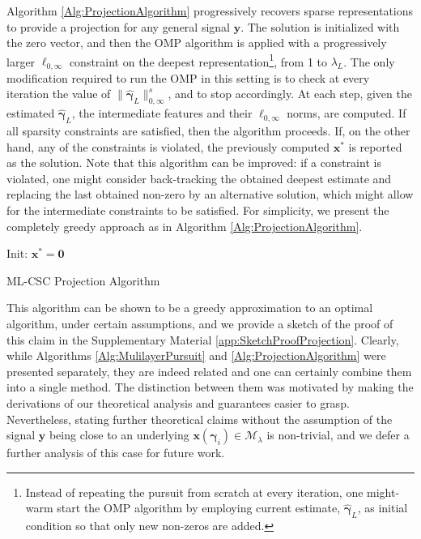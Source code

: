 \documentclass[10pt,journal]{IEEEtran}
\def\x{{\mathbf x}}
\def\y{{\mathbf y}}
\def\D{{\mathbf D}}
\def\M{{\mathcal{M}}}
\def\gama{{\boldsymbol \gamma}}
\theoremstyle{plain}
\theoremstyle{definition}
\begin{document}
Algorithm \ref{Alg:ProjectionAlgorithm} progressively recovers sparse representations to provide a projection for any general signal $\y$. The solution is initialized with the zero vector, and then the OMP algorithm is applied with a progressively larger $\ell_{0,\infty}$ constraint on the deepest representation\footnote{Instead of repeating the pursuit from scratch at every iteration, one might-warm start the OMP algorithm by employing current estimate, $\hat{\gama}_L$, as initial condition so that only new non-zeros are added.}, from 1 to $\lambda_L$. The only modification required to run the OMP in this setting is to check at every iteration the value of $\|\hat{\gama}_L\|^s_{0,\infty}$, and to stop accordingly. At each step, given the estimated $\hat{\gama}_L$, the intermediate features and their $\ell_{0,\infty}$ norms, are computed. If all sparsity constraints are satisfied, then the algorithm proceeds. If, on the other hand, any of the constraints is violated, the previously computed $\x^\ast$ is reported as the solution. Note that this algorithm can be improved: if a constraint is violated, one might consider back-tracking the obtained deepest estimate and replacing the last obtained non-zero by an alternative solution, which might allow for the intermediate constraints to be satisfied. For simplicity, we present the completely greedy approach as in Algorithm \ref{Alg:ProjectionAlgorithm}.


\begin{algorithm}[t] 
	Init: $\x^\ast = \mathbf{0}$ \; %
	\For{$k = 1 : \lambda_L $}{ 
	$ \hat{\gama}_L \leftarrow \text{OMP}(\y,\D^{(L)},k)$ \;
	\For{$j = L : -1 : 1$}{
		$\hat{\gama}_{j-1} \leftarrow \D_j\hat{\gama}_j $\;
		}
		\If{$ \|\hat{\gama}_i\|^s_{0,\infty} > \lambda_i$ for any $1\leq i < L$ }	
		{ break\;}
		\Else{$\x^\ast \leftarrow \D^{(i)}\hat{\gama}_i$\;}

	}
	
	\Return{$\x^\ast$}
	\caption{ML-CSC Projection Algorithm}
	\label{Alg:ProjectionAlgorithm}
\end{algorithm}
This algorithm can be shown to be a greedy approximation to an optimal algorithm, under certain assumptions, and we provide a sketch of the proof of this claim in the Supplementary Material \ref{app:SketchProofProjection}.
Clearly, while Algorithms \ref{Alg:MulilayerPursuit} and \ref{Alg:ProjectionAlgorithm} were presented separately, they are indeed related and one can certainly combine them into a single method. The distinction between them was motivated by making the derivations of our theoretical analysis and guarantees easier to grasp.
Nevertheless, stating further theoretical claims without the assumption of the signal $\y$ being close to an underlying $\x(\gama_i) \in \M_\lambda$ is non-trivial, and we defer a further analysis of this case for future work.
\end{document}
